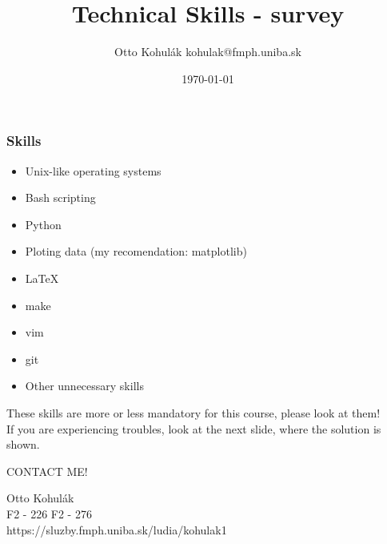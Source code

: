 \documentclass{beamer}
\begin{document}
\title{Technical Skills - survey}   
\author{Otto Kohul\'{a}k \newline kohulak@fmph.uniba.sk} 
\date{\today} 

\frame{\titlepage} 

\begin{frame}
  \frametitle{Skills}
  \begin{itemize}
    \item Unix-like operating systems
    \item Bash scripting
    \item Python
    \item Ploting data (my recomendation: matplotlib)
    \item \LaTeX
    \item make
    \item vim
    \item git
    \item Other unnecessary skills
  \end{itemize}
\end{frame}

\begin{frame}
\centering
  These skills are more or less mandatory for this course, please look at them!\\
  \vspace{2cm}
  If you are experiencing troubles, look at the next slide, where the solution is shown.
\end{frame}

\begin{frame}
\centering
  CONTACT ME!
  
  Otto Kohul\'{a}k\\
  F2 - 226
  F2 - 276\\
  https://sluzby.fmph.uniba.sk/ludia/kohulak1
  
  
\end{frame}
\end{document}

